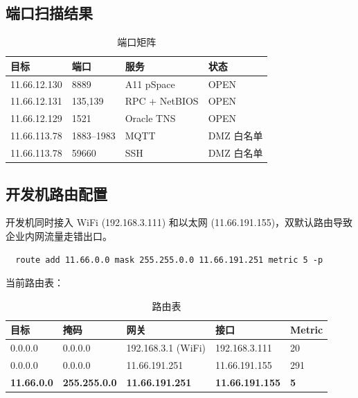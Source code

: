 \documentclass[12pt,a4paper]{ctexart}
\begin{document}
\subsection{端口扫描结果}

\begin{table}[H]\centering
\caption{端口矩阵}
\begin{tabular}{p{2.5cm} p{2cm} p{5.5cm} p{4cm}}
\toprule
\textbf{目标} & \textbf{端口} & \textbf{服务} & \textbf{状态} \\
\midrule
11.66.12.130 & 8889 & A11 pSpace & OPEN \\
11.66.12.131 & 135,139 & RPC + NetBIOS & OPEN \\
11.66.12.129 & 1521 & Oracle TNS & OPEN \\
11.66.113.78 & 1883--1983 & MQTT & DMZ 白名单 \\
11.66.113.78 & 59660 & SSH & DMZ 白名单 \\
\bottomrule
\end{tabular}
\end{table}

\subsection{开发机路由配置}

开发机同时接入 WiFi (192.168.3.111) 和以太网 (11.66.191.155)，双默认路由导致企业内网流量走错出口。

\begin{verbatim}
  route add 11.66.0.0 mask 255.255.0.0 11.66.191.251 metric 5 -p
\end{verbatim}

当前路由表：

\begin{table}[H]\centering
\caption{路由表}
\begin{tabular}{p{3cm} p{2.5cm} p{3cm} p{3cm} p{1.2cm}}
\toprule
\textbf{目标} & \textbf{掩码} & \textbf{网关} & \textbf{接口} & \textbf{Metric} \\
\midrule
0.0.0.0 & 0.0.0.0 & 192.168.3.1 (WiFi) & 192.168.3.111 & 20 \\
0.0.0.0 & 0.0.0.0 & 11.66.191.251 & 11.66.191.155 & 291 \\
\textbf{11.66.0.0} & \textbf{255.255.0.0} & \textbf{11.66.191.251} & \textbf{11.66.191.155} & \textbf{5} \\
\bottomrule
\end{tabular}
\end{table}

\end{document}

